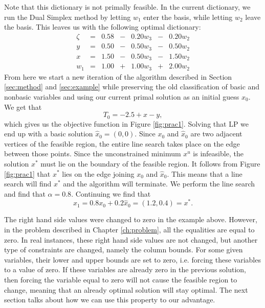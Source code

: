 Note that this dictionary is not primally feasible. 
In the current dictionary, we run the Dual Simplex method by letting $w_1$
enter the basis, while letting $w_2$ leave the basis.
This leaves us with the following optimal dictionary:
\[
    \begin{array}{rcrcrcr}
        \zeta &=& 0.58 &-& 0.20 w_3 &-& 0.20 w_2 \\ \hline
            y &=& 0.50 &-& 0.50 w_3 &-& 0.50 w_2 \\
            x &=& 1.50 &-& 0.50 w_3 &-& 1.50 w_2 \\
          w_1 &=& 1.00 &+& 1.00 w_3 &+& 2.00 w_2
    \end{array}
\]
From here we start a new iteration of the algorithm described in Section
\ref{sec:method} and \ref{sec:example} while preserving the old classification
of basic and nonbasic variables and using our current primal solution as an
initial guess $x_0$. We get that
\[
    T_0 = -2.5 + x - y,
\]
which gives us the objective function in Figure \ref{fig:prac1}. Solving that
LP we end up with a basic solution $\hat{x}_0 = (0,0)$. Since $x_0$ and
$\hat{x}_0$ are two adjacent vertices of the feasible region, the entire line
search takes place on the edge between those points.
Since the unconstrained minimum $x^u$ is infeasible, the solution $x^*$ must
lie on the boundary of the feasible region.
It follows from Figure \ref{fig:prac1} that $x^*$ lies on the edge joining 
$x_0$ and $\hat{x}_0$.
This means that a line search will find $x^*$ and the algorithm will terminate.
We perform the line search and find that $\alpha = 0.8$.
Continuing we find that
\[
    x_1 = 0.8 x_0 + 0.2 \hat{x}_0 = (1.2, 0.4) = x^*.
\]

The right hand side values were changed to zero in the example above. However,
in the problem described in Chapter \ref{ch:problem}, all the equalities are
equal to zero. In real instances, these right hand side values are not changed,
but another type of constraints are changed, namely the column bounds. For some
given variables, their lower and upper bounds are set to zero, i.e. forcing
these variables to a value of zero. If these variables are already zero in the
previous solution, then forcing the variable equal to zero will not cause the
feasible region to change, meaning that an already optimal solution will stay
optimal. The next section talks about how we can use this property to our
advantage.
